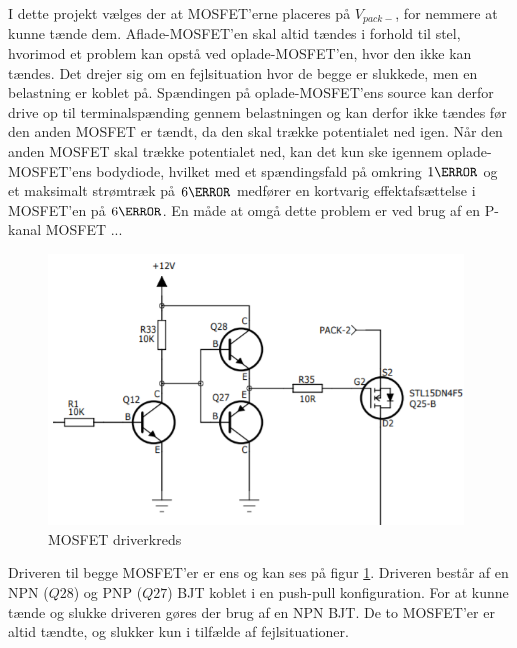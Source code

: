 I dette projekt vælges der at MOSFET'erne placeres på $V_{pack-}$, for nemmere at kunne tænde dem. Aflade-MOSFET'en skal altid tændes i forhold til stel, hvorimod et problem kan opstå ved oplade-MOSFET'en, hvor den ikke kan tændes. Det drejer sig om en fejlsituation hvor de begge er slukkede, men en belastning er koblet på. Spændingen på oplade-MOSFET'ens source kan derfor drive op til terminalspænding gennem belastningen og kan derfor ikke tændes før den anden MOSFET er tændt, da den skal trække potentialet ned igen. Når den anden MOSFET skal trække potentialet ned, kan det kun ske igennem oplade-MOSFET'ens bodydiode, hvilket med et spændingsfald på omkring $1\volt$ og et maksimalt strømtræk på $6\ampere$ medfører en kortvarig effektafsættelse i MOSFET'en på $6\watt$.
En måde at omgå dette problem er ved brug af en P-kanal MOSFET ...


\begin{figure}[h]
	\centering
	\includegraphics[width=11cm]{billeder/mosfet_driver.png}
	\caption{MOSFET driverkreds}
	\label{fig:mosfet_driver}
\end{figure}

Driveren til begge MOSFET'er er ens og kan ses på figur \ref{fig:mosfet_driver}. Driveren består af en NPN ($Q28$) og PNP ($Q27$) BJT koblet i en push-pull konfiguration. For at kunne tænde og slukke driveren gøres der brug af en NPN BJT. De to MOSFET'er er altid tændte, og slukker kun i tilfælde af fejlsituationer.



